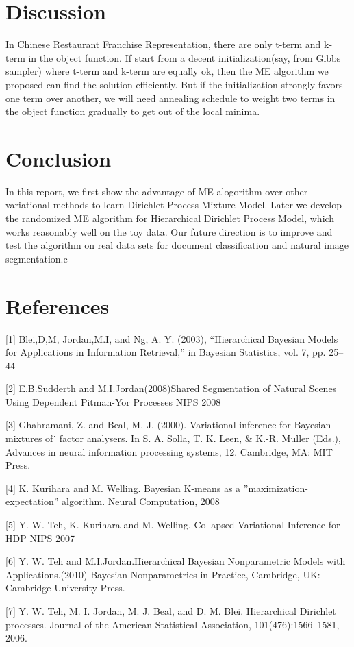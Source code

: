 \documentclass{article}
\begin{document}
\section{Discussion}
In Chinese Restaurant Franchise Representation, there are only t-term and k-term in the object function.
If start from a decent initialization(say, from Gibbs sampler) where t-term and k-term are equally ok, then the ME algorithm we proposed can find the solution efficiently.
But if the initialization strongly favors one term over another, we will need annealing schedule to weight two terms in the object function gradually to get out of the local minima.  
\section{Conclusion}
In this report, we first show the advantage of ME alogorithm over other variational methods to learn Dirichlet Process Mixture Model. Later we 
develop the randomized ME algorithm for Hierarchical Dirichlet Process Model, which works reasonably well on the toy data. Our future 
direction is to improve and test the algorithm on real data sets for document classification and natural image segmentation.c


\section{References}
\small{
[1]  Blei,D,M, Jordan,M.I, and Ng, A. Y. (2003), “Hierarchical Bayesian Models for Applications 
  in Information Retrieval,” in Bayesian Statistics, vol. 7, pp. 25–44 

[2] E.B.Sudderth and M.I.Jordan(2008)Shared Segmentation of Natural Scenes Using Dependent Pitman-Yor Processes NIPS 2008


[3] Ghahramani, Z. and Beal, M. J. (2000). Variational inference for Bayesian mixtures of                                                          ̈
  factor analysers. In S. A. Solla, T. K. Leen, \& K.-R. Muller (Eds.), Advances in neural
  information processing systems, 12. Cambridge, MA: MIT Press.

[4] K. Kurihara and M. Welling. Bayesian K-means as a
 ”maximization-expectation” algorithm. Neural Computation, 2008

[5] Y. W. Teh, K. Kurihara and M. Welling. Collapsed Variational Inference for HDP
NIPS 2007

[6] Y. W. Teh and M.I.Jordan.Hierarchical Bayesian Nonparametric Models with Applications.(2010) Bayesian 
Nonparametrics in Practice, Cambridge, UK: Cambridge University Press.

[7] Y. W. Teh, M. I. Jordan, M. J. Beal, and D. M. Blei. Hierarchical Dirichlet processes. Journal of the 
American Statistical Association, 101(476):1566–1581, 2006.

}
\end{document}

